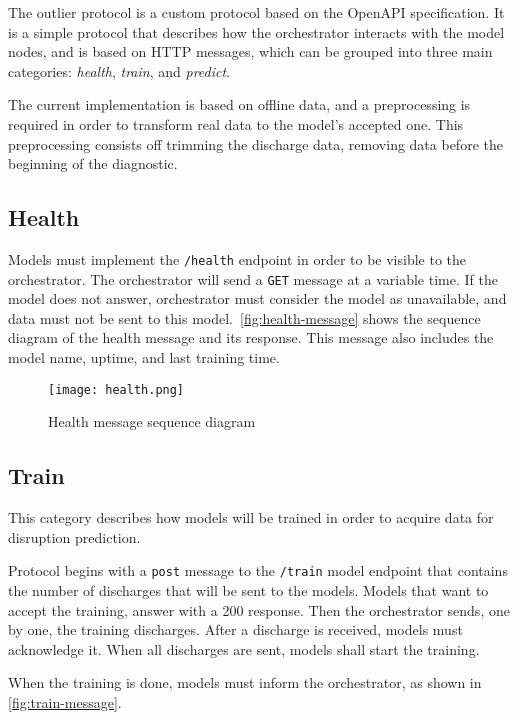 The outlier protocol is a custom protocol based on the OpenAPI specification. It is a simple protocol that describes how the orchestrator interacts with the model nodes, and is based on \ac{HTTP} messages, which can be grouped into three main categories: \textit{health}, \textit{train}, and \textit{predict}.

The current implementation is based on offline data, and a preprocessing is required in order to transform real data to the model's accepted one. This preprocessing consists off trimming the discharge data, removing data before the beginning of the diagnostic.

\subsection{Health}

Models must implement the \texttt{/health} endpoint in order to be visible to the orchestrator. The orchestrator will send a \texttt{GET} message at a variable time. If the model does not answer, orchestrator must consider the model as unavailable, and data must not be sent to this model.\ \autoref{fig:health-message} shows the sequence diagram of the health message and its response. This message also includes the model name, uptime, and last training time.

\begin{figure}[H]
    \centering
    \texttt{[image: health.png]}
    \caption{Health message sequence diagram}
    \label{fig:health-message}
\end{figure}

\subsection{Train} 

This category describes how models will be trained in order to acquire data for disruption prediction. 

Protocol begins with a \texttt{post} message to the \texttt{/train} model endpoint that contains the number of discharges that will be sent to the models. Models that want to accept the training, answer with a 200 response. Then the orchestrator sends, one by one, the training discharges. After a discharge is received, models must acknowledge it. When all discharges are sent, models shall start the training.

When the training is done, models must inform the orchestrator, as shown in \autoref{fig:train-message}.

